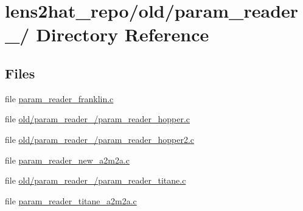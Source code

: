 \section{lens2hat\-\_\-repo/old/param\-\_\-reader\-\_/ Directory Reference}
\label{dir_9cba7731df954499ac1d844977df81e3}
\subsection*{Files}
\begin{DoxyCompactItemize}
\item 
file \hyperlink{param__reader__franklin_8c}{param\-\_\-reader\-\_\-franklin.\-c}
\item 
file \hyperlink{old_2param__reader__20121302_2param__reader__hopper_8c}{old/param\-\_\-reader\-\_/param\-\_\-reader\-\_\-hopper.\-c}
\item 
file \hyperlink{old_2param__reader__20121302_2param__reader__hopper2_8c}{old/param\-\_\-reader\-\_/param\-\_\-reader\-\_\-hopper2.\-c}
\item 
file \hyperlink{param__reader__new__a2m2a_8c}{param\-\_\-reader\-\_\-new\-\_\-a2m2a.\-c}
\item 
file \hyperlink{old_2param__reader__20121302_2param__reader__titane_8c}{old/param\-\_\-reader\-\_/param\-\_\-reader\-\_\-titane.\-c}
\item 
file \hyperlink{param__reader__titane__a2m2a_8c}{param\-\_\-reader\-\_\-titane\-\_\-a2m2a.\-c}
\end{DoxyCompactItemize}
